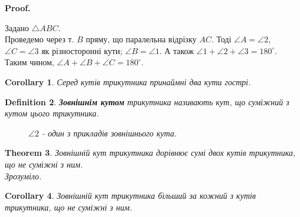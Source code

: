 \documentclass[a4paper, 10pt]{article}
\makeatletter
\def\qed{$\blacksquare$}
\theoremstyle{theoremdd}
\newtheorem{theorem}{Theorem}[subsection]
\theoremstyle{theoremdd}
\theoremstyle{theoremdd}
\newtheorem{definition}[theorem]{Definition}
\theoremstyle{theoremdd}
\theoremstyle{theoremdd}
\theoremstyle{theoremdd}
\theoremstyle{theoremdd}
\theoremstyle{theoremdd}
\theoremstyle{theoremdd}
\newtheorem{corollary}[theorem]{Corollary}
\renewenvironment{proof}[1][Proof.\\]{\par
\pushQED{\hfill \qed}%
\normalfont \topsep6\p@\@plus6\p@\relax
\trivlist
\item\relax
{\bfseries
#1\@addpunct{.}}\hspace\labelsep\ignorespaces
}{%
\popQED\endtrivlist\@endpefalse
}
\makeatother
\begin{document}
\begin{proof}
Задано $\triangle ABC$.\\
Проведемо через т. $B$ пряму, що паралельна відрізку $AC$. Тоді $\angle A = \angle 2$, $\angle C = \angle 3$ як різносторонні кути; $\angle B = \angle 1$. А також $\angle 1 + \angle 2 + \angle 3 = 180^\circ$.\\
Таким чином, $\angle A + \angle B + \angle C = 180^\circ$.
\begin{figure}[H]
\centering
{}
\end{figure}
\end{proof}

\begin{corollary}
Серед кутів трикутника принаймні два кути гострі.
\end{corollary}

\begin{definition}
\textbf{Зовнішнім кутом} трикутника називають кут, що суміжний з кутом цього трикутника.
\begin{figure}[H]
\centering
{}
\caption*{$\angle 2$ - один з прикладів зовнішнього кута.}
\end{figure}
\end{definition}

\begin{theorem}
Зовнішній кут трикутника дорівнює сумі двох кутів трикутника, що не суміжні з ним.\\
\textit{Зрозуміло.}
\end{theorem}

\begin{corollary}
Зовнішній кут трикутника більший за кожний з кутів трикутника, що не суміжні з ним.
\end{corollary}
\end{document}
